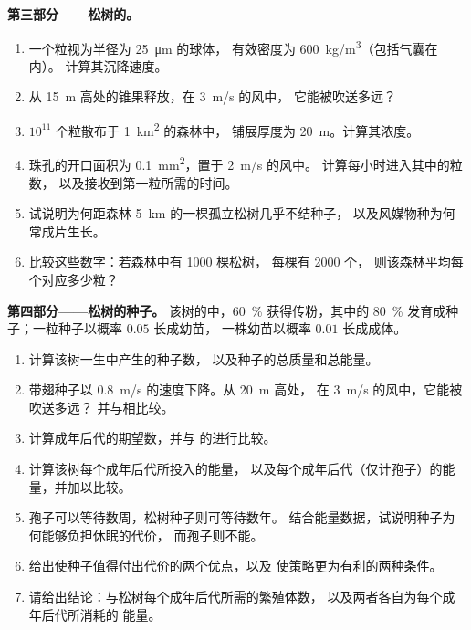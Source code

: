 \begin{problem}
\medskip
\noindent\textbf{第三部分——松树的。}
\begin{enumerate}[resume]
  \item 一个粒视为半径为 \qty{25}{\micro m} 的球体，
        有效密度为 \qty{600}{kg/m^3}（包括气囊在内）。
        计算其沉降速度。
  \item 从 \qty{15}{m} 高处的锥果释放，在 \qty{3}{m/s} 的风中，
        它能被吹送多远？
  \item $10^{11}$ 个粒散布于 \qty{1}{km^2} 的森林中，
        铺展厚度为 \qty{20}{m}。计算其浓度。
  \item 珠孔的开口面积为 \qty{0.1}{mm^2}，置于 \qty{2}{m/s} 的风中。
        计算每小时进入其中的粒数，
        以及接收到第一粒所需的时间。
  \item 试说明为何距森林 \qty{5}{km} 的一棵孤立松树几乎不结种子，
        以及风媒物种为何
        常成片生长。
  \item 比较这些数字：若森林中有 \num{1000} 棵松树，
        每棵有 \num{2000} 个，
        则该森林平均每个对应多少粒？
\end{enumerate}

\medskip
\noindent\textbf{第四部分——松树的种子。}
该树的中，\qty{60}{\%} 获得传粉，其中的 \qty{80}{\%}
发育成种子；一粒种子以概率 $0.05$ 长成幼苗，
一株幼苗以概率 $0.01$ 长成成体。
\begin{enumerate}[resume]
  \item 计算该树一生中产生的种子数，
        以及种子的总质量和总能量。
  \item 带翅种子以 \qty{0.8}{m/s} 的速度下降。从 \qty{20}{m} 高处，
        在 \qty{3}{m/s} 的风中，它能被吹送多远？
        并与相比较。
  \item 计算成年后代的期望数，并与
        的进行比较。
  \item 计算该树每个成年后代所投入的能量，
        以及每个成年后代（仅计孢子）的能量，并加以比较。
  \item {}孢子可以等待数周，松树种子则可等待数年。
        结合能量数据，试说明种子为何能够负担休眠的代价，
        而孢子则不能。
  \item 给出使种子值得付出代价的两个优点，以及
        使策略更为有利的两种条件。
  \item 请给出结论：与松树每个成年后代所需的繁殖体数，
        以及两者各自为每个成年后代所消耗的
        能量。
\end{enumerate}
\end{problem}
